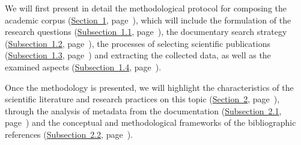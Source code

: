 \begin{refsegment}
We will first present in detail the methodological protocol for composing the academic corpus (\hyperref[chap2:protocole-methodologique-rsl]{Section~1}, page~\pageref{chap2:protocole-methodologique-rsl}), which will include the formulation of the research questions (\hyperref[chap2:formulation-questions-recherche]{Subsection~1.1}, page~\pageref{chap2:formulation-questions-recherche}), the documentary search strategy (\hyperref[chap2:strategie-recherche-documentaire]{Subsection~1.2}, page~\pageref{chap2:strategie-recherche-documentaire}), the processes of selecting scientific publications (\hyperref[chap2:selection-publications-scientifiques]{Subsection~1.3}, page~\pageref{chap2:selection-publications-scientifiques}) and extracting the collected data, as well as the examined aspects (\hyperref[chap2:extraction-donnees-aspects-consideres]{Subsection~1.4}, page~\pageref{chap2:extraction-donnees-aspects-consideres}).%

Once the methodology is presented, we will highlight the characteristics of the scientific literature and research practices on this topic (\hyperref[chap2:analyse-documentation-rsl]{Section~2}, page~\pageref{chap2:analyse-documentation-rsl}), through the analysis of metadata from the documentation (\hyperref[chap2:etat-litterature-scientifique-internationale-btod]{Subsection~2.1}, page~\pageref{chap2:etat-litterature-scientifique-internationale-btod}) and the conceptual and methodological frameworks of the bibliographic references (\hyperref[chap2:cadres-conceptuels-methodologiques]{Subsection~2.2}, page~\pageref{chap2:cadres-conceptuels-methodologiques}).%


\end{refsegment}
